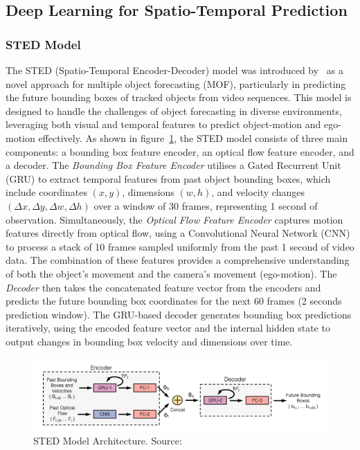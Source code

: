 \documentclass[12pt,oneside]{book} %
\begin{document}
\subsection*{Deep Learning for Spatio-Temporal Prediction}
\subsubsection*{STED Model}

The STED (Spatio-Temporal Encoder-Decoder) model was introduced
by~\citet{MultipleObjectForecasting} as a novel approach for multiple object
forecasting (MOF), particularly in predicting the future bounding boxes of
tracked objects from video sequences. This model is designed to handle the
challenges of object forecasting in diverse environments, leveraging both
visual and temporal features to predict object-motion and ego-motion
effectively. As shown in figure~\ref{fig:sted}, the STED model consists of
three main components: a bounding box feature encoder, an optical flow feature
encoder, and a decoder. The \textit{Bounding Box Feature Encoder} utilises a
Gated Recurrent Unit (GRU) to extract temporal features from past object
bounding boxes, which include coordinates $(x, y)$, dimensions $(w, h)$, and
velocity changes $(\Delta x, \Delta y, \Delta w, \Delta h)$ over a window of 30
frames, representing 1 second of observation. Simultaneously, the
\textit{Optical Flow Feature Encoder} captures motion features directly from
optical flow, using a Convolutional Neural Network (CNN) to process a stack of
10 frames sampled uniformly from the past 1 second of video data. The
combination of these features provides a comprehensive understanding of both
the object's movement and the camera's movement (ego-motion). The
\textit{Decoder} then takes the concatenated feature vector from the encoders
and predicts the future bounding box coordinates for the next 60 frames (2
seconds prediction window). The GRU-based decoder generates bounding box
predictions iteratively, using the encoded feature vector and the internal
hidden state to output changes in bounding box velocity and dimensions over
time.

\begin{figure}[H]
    \centering
    \includegraphics[width=1\textwidth]{figures/STED.png}
    \caption{STED Model Architecture. Source:~\citet{MultipleObjectForecasting}}\label{fig:sted}
\end{figure}
\end{document}
